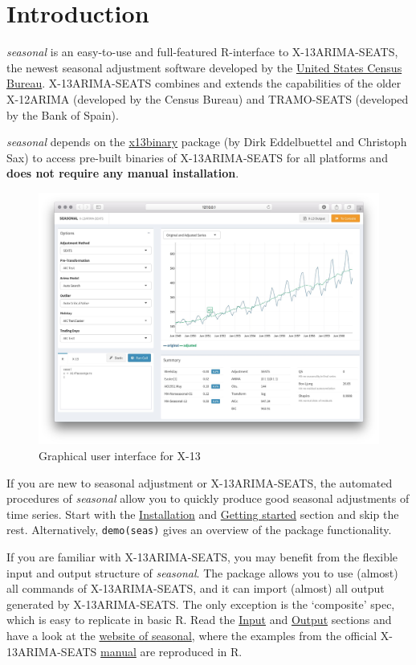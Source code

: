 \section{Introduction}\label{introduction}

\emph{seasonal} is an easy-to-use and full-featured R-interface to
X-13ARIMA-SEATS, the newest seasonal adjustment software developed by
the \href{http://www.census.gov/srd/www/x13as/}{United States Census
Bureau}. X-13ARIMA-SEATS combines and extends the capabilities of the
older X-12ARIMA (developed by the Census Bureau) and TRAMO-SEATS
(developed by the Bank of Spain).

\emph{seasonal} depends on the
\href{https://cran.r-project.org/package=x13binary}{x13binary} package
(by Dirk Eddelbuettel and Christoph Sax) to access pre-built binaries of
X-13ARIMA-SEATS for all platforms and \textbf{does not require any
manual installation}.

\begin{figure}[htbp]
\centering
\includegraphics[width=\textwidth]{images/view.jpg}
\caption{Graphical user interface for X-13}
\end{figure}

If you are new to seasonal adjustment or X-13ARIMA-SEATS, the automated
procedures of \emph{seasonal} allow you to quickly produce good seasonal
adjustments of time series. Start with the
\hyperref[installation]{Installation} and
\hyperref[getting-started]{Getting started} section and skip the rest.
Alternatively, \texttt{demo(seas)} gives an overview of the package
functionality.

If you are familiar with X-13ARIMA-SEATS, you may benefit from the
flexible input and output structure of \emph{seasonal}. The package
allows you to use (almost) all commands of X-13ARIMA-SEATS, and it can
import (almost) all output generated by X-13ARIMA-SEATS. The only
exception is the `composite' spec, which is easy to replicate in basic
R. Read the \hyperref[input]{Input} and \hyperref[output]{Output}
sections and have a look at the
\href{http://www.seasonal.website/examples.html}{website of seasonal},
where the examples from the official X-13ARIMA-SEATS
\href{http://www.census.gov/ts/x13as/docX13ASHTML.pdf}{manual} are
reproduced in R.

